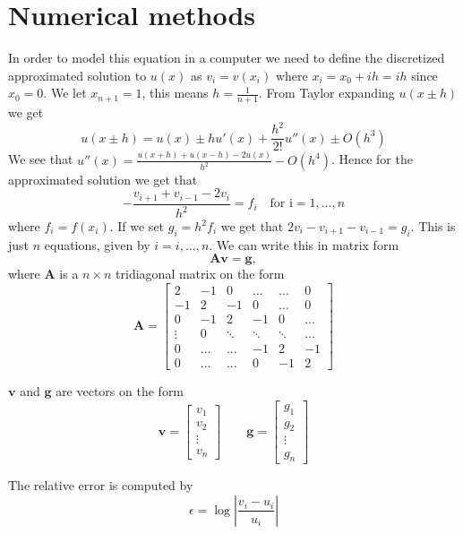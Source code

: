 \documentclass[10pt]{article}
\begin{document}
\section{Numerical methods}
In order to model this equation in a computer we need to define the 
discretized approximated solution to $ u(x) $ as $v_i=v(x_i) $ where
 $x_i=x_0+ih=ih$ since $x_0=0$. We let $x_{n+1}=1$, this means $h=\frac{1}{n+1}$.
 From Taylor expanding $u(x\pm h)$ we get 
 $$u(x\pm h)=u(x)\pm hu'(x)+\frac{h^2}{2!}u''(x)\pm O(h^3)$$
We see that $u''(x)=\frac{u(x+h)+u(x-h)-2u(x)}{h^2}-O(h^4)$. Hence for the approximated solution
 we get that $$-\frac{v_{i+1}+v_{i-1}-2v_i}{h^2}=f_i\quad \text{for i}=1,...,n$$ where $f_i=f(x_i)$. 
 If we set $g_i=h^2f_i$ we get that $2v_i-v_{i+1}-v_{i-1}=g_i$. 
 This is just $n$ equations, given by $i=i,...,n$. We can write this in matrix form 
 $$\mathbf{A}\mathbf{v}=\mathbf{g}, $$ where $\mathbf{A}$ is a $n\times n$ 
 tridiagonal matrix on the form $$\mathbf{A}=\begin{bmatrix}
   2 & -1 & 0 & \dots & ... & 0 \\
   -1 & 2 & -1 & 0 & ... & 0 \\
   0  & -1 & 2 & -1 & 0 & ... \\
   \vdots & 0 & \ddots & \ddots & \ddots & ...\\
   0 & ... & ... & -1 & 2 & -1\\
   0 & ... & ... & 0 & -1 & 2 
 \end{bmatrix}$$

 $\mathbf{v}$ and $\mathbf{g}$ are vectors on the form 
 $$\mathbf{v}=\begin{bmatrix}
   v_1\\v_2\\\vdots\\v_n
 \end{bmatrix}
 \qquad
 \mathbf{g}=\begin{bmatrix}
   g_1\\g_2\\\vdots\\g_n
 \end{bmatrix}
 $$

 The relative error is computed by 
 \begin{equation}\label{eq:rel_error}
  \epsilon=\log{\left|\frac{v_{i}-u_{i}}{u_{i}}\right|}
 \end{equation} 
  
\end{document}
